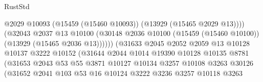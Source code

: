 \begin{lexlean}{RustStd}
\begin{coremodule}
                                              @2029
                                              @10093
                                              (@15459 (@15460 @10093))
                                              (@13929 (@15465 @2029 @13))))
                                          (@32043
                                            @2037
                                            @13
                                            @10100
                                            (@30148
                                              @2036
                                              @10100
                                              (@15459 (@15460 @10100))
                                              (@13929 (@15465 @2036 @13))))))
                                      (@31633
                                        @2045
                                        @2052
                                        @2059
                                        @13
                                        @10128
                                        @10137
                                        @3222
                                        @10152
                                        (@31644
                                          @2044
                                          @1014
                                          @19390
                                          @10128
                                          @10135
                                          @8781
                                          (@31653
                                            @2043
                                            @53
                                            @55
                                            @3871
                                            @10127
                                            @10134
                                            @3257
                                            @10108
                                            @3263
                                            @30126
                                            (@31652
                                              @2041
                                              @103
                                              @53
                                              @16
                                              @10124
                                              @3222
                                              @3236
                                              @3257
                                              @10118
                                              @3263

\end{coremodule}
\end{lexlean}
